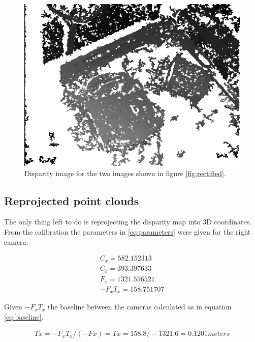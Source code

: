 \begin{figure}[h!]
   \centering
    \includegraphics[scale=0.4]{graphics/06_vision/disparity_example.jpg}
    \caption{Disparity image for the two images shown in figure \ref{fig:rectified}. }
    \label{fig:disparity}
\end{figure}


\subsection{Reprojected point clouds} \label{sec:repro_point}

The only thing left to do is reprojecting the disparity map into 3D coordinates. From the calibration the parameters in \ref{eq:parameters} were given for the right camera.

\begin{equation}\label{eq:parameters}
\begin{split}
C_{x} = 582.152313 \\
C_{y} = 393.397633 \\
F_{x} = 1321.556521 \\
-F_{x}T_{x} = 158.751707 
\end{split}
\end{equation} 

Given $ -F_{x}T_{x} $ the baseline between the cameras calculated as in equation \ref{eq:baseline}.

\begin{equation}\label{eq:baseline}
\begin{split}
Tx = -F_{x}T_{x}/(-Fx) = Tx = 158.8/-1321.6 = 0.1201 meters
\end{split}
\end{equation} 

